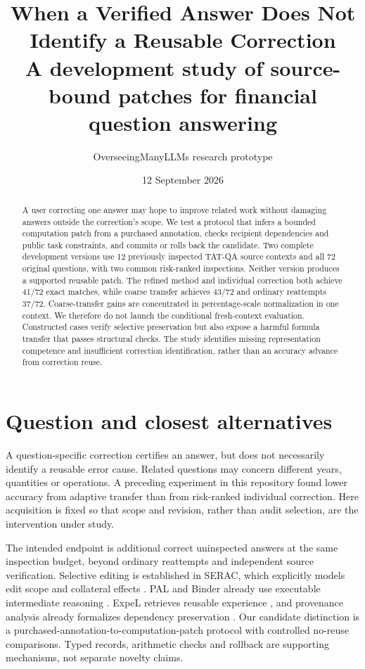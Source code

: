 \documentclass[10pt]{article}
\title{When a Verified Answer Does Not Identify a Reusable Correction\\\large A development study of source-bound patches for financial question answering}
\author{OverseeingManyLLMs research prototype}\date{12 September 2026}
\begin{document}
\maketitle
\begin{abstract}
A user correcting one answer may hope to improve related work without damaging answers outside the correction's scope. We test a protocol that infers a bounded computation patch from a purchased annotation, checks recipient dependencies and public task constraints, and commits or rolls back the candidate. Two complete development versions use 12 previously inspected TAT-QA source contexts and all 72 original questions, with two common risk-ranked inspections. Neither version produces a supported reusable patch. The refined method and individual correction both achieve 41/72 exact matches, while coarse transfer achieves 43/72 and ordinary reattempts 37/72. Coarse-transfer gains are concentrated in percentage-scale normalization in one context. We therefore do not launch the conditional fresh-context evaluation. Constructed cases verify selective preservation but also expose a harmful formula transfer that passes structural checks. The study identifies missing representation competence and insufficient correction identification, rather than an accuracy advance from correction reuse.
\end{abstract}

\section{Question and closest alternatives}
A question-specific correction certifies an answer, but does not necessarily identify a reusable error cause. Related questions may concern different years, quantities or operations. A preceding experiment in this repository found lower accuracy from adaptive transfer than from risk-ranked individual correction. Here acquisition is fixed so that scope and revision, rather than audit selection, are the intervention under study.

The intended endpoint is additional correct uninspected answers at the same inspection budget, beyond ordinary reattempts and independent source verification. Selective editing is established in SERAC, which explicitly models edit scope and collateral effects \cite{serac}. PAL and Binder already use executable intermediate reasoning \cite{pal,binder}. ExpeL retrieves reusable experience \cite{expel}, and provenance analysis already formalizes dependency preservation \cite{provenance}. Our candidate distinction is a purchased-annotation-to-computation-patch protocol with controlled no-reuse comparisons. Typed records, arithmetic checks and rollback are supporting mechanisms, not separate novelty claims.
\end{document}

